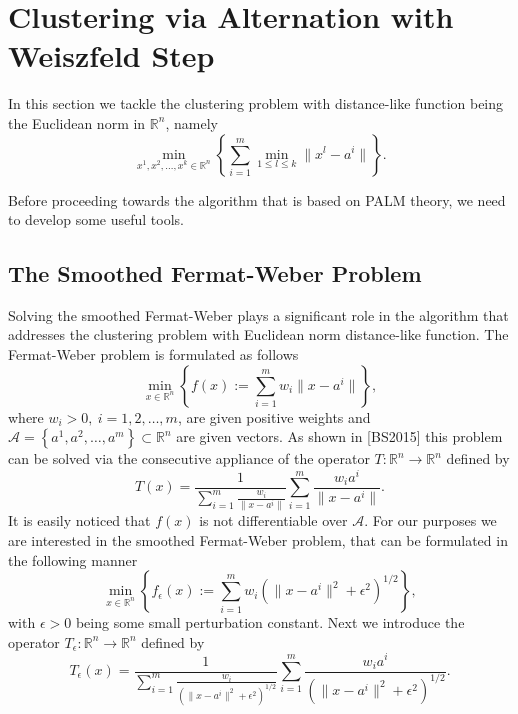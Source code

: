 \documentclass[11pt]{article}
\numberwithin{equation}{section}
\begin{document}
\section{Clustering via Alternation with Weiszfeld Step}

In this section we tackle the clustering problem with distance-like function being the Euclidean norm in $\mathbb{R}^n$, namely
\begin{equation}
	\min_{x^1, x^2, \ldots, x^k \in \mathbb{R}^n} \left\lbrace \sum\limits_{i=1}^{m} \min\limits_{1 \leq l \leq k} \|x^l - a^i\| \right\rbrace . \label{StateEq30}
\end{equation}

Before proceeding towards the algorithm that is based on PALM theory, we need to develop some useful tools.

\subsection{The Smoothed Fermat-Weber Problem}
Solving the smoothed Fermat-Weber plays a significant role in the algorithm that addresses the clustering problem with Euclidean norm distance-like function.
The Fermat-Weber problem is formulated as follows
\begin{equation}
	\min_{x \in \mathbb{R}^n} \left\lbrace f(x) := \sum\limits_{i=1}^{m} w_i\|x - a^i\| \right\rbrace , \label{StateEq60}
\end{equation}
where $w_i>0, \: i=1,2, \ldots, m$, are given positive weights and $\mathcal{A} = \left\lbrace a^1, a^2, \ldots, a^m \right\rbrace \subset \mathbb{R}^n$ are given vectors. As shown in [BS2015] this problem can be solved via the consecutive appliance of the operator $T: \mathbb{R}^n \rightarrow \mathbb{R}^n$ defined by
\begin{equation*}
	T(x) = \frac{1}{\sum\limits_{i=1}^{m}\frac{w_i}{\|x - a^i\|}} \sum\limits_{i=1}^{m}\frac{w_i a^i}{\|x - a^i\|} .
\end{equation*}
It is easily noticed that $f(x)$ is not differentiable over $\mathcal{A}$.  For our purposes we are interested in the smoothed Fermat-Weber problem, that can be formulated in the following manner
\begin{equation}
	\min_{x \in \mathbb{R}^n} \left\lbrace f_{\epsilon}(x) := \sum\limits_{i=1}^{m} w_i \left( \|x - a^i\|^2 + {\epsilon}^2 \right)^{1/2} \right\rbrace , \label{StateEq61}
\end{equation}
with $\epsilon > 0$ being some small perturbation constant. Next we introduce the operator $T_{\epsilon}: \mathbb{R}^n \rightarrow \mathbb{R}^n$ defined by 
\begin{equation*}
	T_{\epsilon}(x) = \frac{1}{\sum\limits_{i=1}^{m}\frac{w_i}{\left( \|x - a^i\|^2 + {\epsilon}^2 \right)^{1/2}}} \sum\limits_{i=1}^{m}\frac{w_i a^i}{\left( \|x - a^i\|^2 + {\epsilon}^2 \right)^{1/2}} .
\end{equation*}
\end{document}
